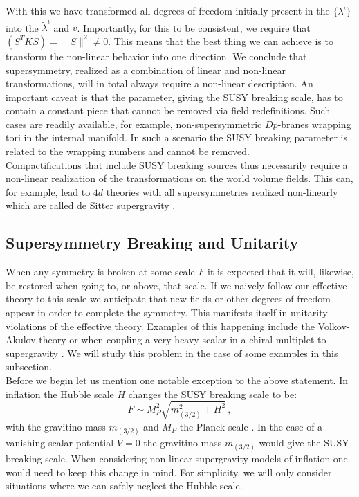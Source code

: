 \documentclass[a4paper,12pt]{report}
\newcommand{\be}{\begin{equation}}
\newcommand{\ee}{\end{equation}}
\begin{document}
With this we have transformed all degrees of freedom initially present in the $\{\lambda^i\}$ into the $\tilde{\lambda}^i$ and $v$. Importantly, for this to be consistent, we require that $ \left( S^T K S \right) = \| S \|^2 \neq0$. This means that the best thing we can achieve is to transform the non-linear behavior into one direction. We conclude that supersymmetry, realized as a combination of linear and non-linear transformations, will in total always require a non-linear description. An important caveat is that the parameter, giving the SUSY breaking scale, has to contain a constant piece that cannot be removed via field redefinitions. Such cases are readily available, for example, non-supersymmetric $Dp$-branes wrapping tori in the internal manifold. In such a scenario the SUSY breaking parameter is related to the wrapping numbers and cannot be removed.\\
Compactifications that include SUSY breaking sources thus necessarily require a non-linear realization of the transformations on the world volume fields. This can, for example, lead to $4d$ theories with all supersymmetries realized non-linearly which are called de Sitter supergravity \cite{Antoniadis:2014oya,Dudas:2015eha,Bergshoeff:2015tra,Hasegawa:2015bza,Kallosh:2015sea,Schillo:2015ssx}.

\subsection{Supersymmetry Breaking and Unitarity}
When any symmetry is broken at some scale $F$ it is expected that it will, likewise, be restored when going to, or above, that scale. If we naively follow our effective theory to this scale we anticipate that new fields or other degrees of freedom appear in order to complete the symmetry. This manifests itself in unitarity violations of the effective theory. Examples of this happening include the Volkov-Akulov theory \cite{Volkov:1972jx,Volkov:1973ix} or when coupling a very heavy scalar in a chiral multiplet to supergravity \cite{Casalbuoni:1988sx}. We will study this problem in the case of some examples in this subsection.\\
Before we begin let us mention one notable exception to the above statement. In inflation the Hubble scale $H$ changes the SUSY breaking scale to be:
\be 
F \sim M_P^2 \sqrt{m^2_{(3/2)} + H^2 } \,,
\ee
with the gravitino mass $m_{(3/2)}$ and $M_P$ the Planck scale \cite{Kallosh:2000ve,DallAgata:2014qsj,Ferrara:2015tyn,Carrasco:2015iij,Ferrara:2016een}. In the case of a vanishing scalar potential $V=0$ the gravitino mass $m_{(3/2)}$ would give the SUSY breaking scale. When considering non-linear supergravity models of inflation one would need to keep this change in mind. For simplicity, we will only consider situations where we can safely neglect the Hubble scale.
\end{document}

